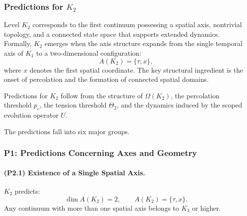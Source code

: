 

\subsubsection{Predictions for \texorpdfstring{$K_2$}{K_2}}
\label{sec:predictions-k2}

Level $K_2$ corresponds to the first continuum possessing a spatial axis,
nontrivial topology, and a connected state space that supports extended
dynamics. Formally, $K_2$ emerges when the axis structure expands from the
single temporal axis of $K_1$ to a two-dimensional configuration:
\[
A(K_2) = \{\tau, x\},
\]
where $x$ denotes the first spatial coordinate. The key structural ingredient
is the onset of percolation and the formation of connected spatial domains.

Predictions for $K_2$ follow from the structure of $\Omega(K_2)$,
the percolation threshold $p_c$, the tension threshold $\Theta_2$, and the
dynamics induced by the scoped evolution operator $U$.

The predictions fall into six major groups.

\subsubsection{P1: Predictions Concerning Axes and Geometry}

\paragraph{(P2.1) Existence of a Single Spatial Axis.}
$K_2$ predicts:
\[
\dim A(K_2) = 2, \qquad A(K_2) = \{\tau, x\}.
\]
Any continuum with more than one spatial axis belongs to $K_3$ or higher.

